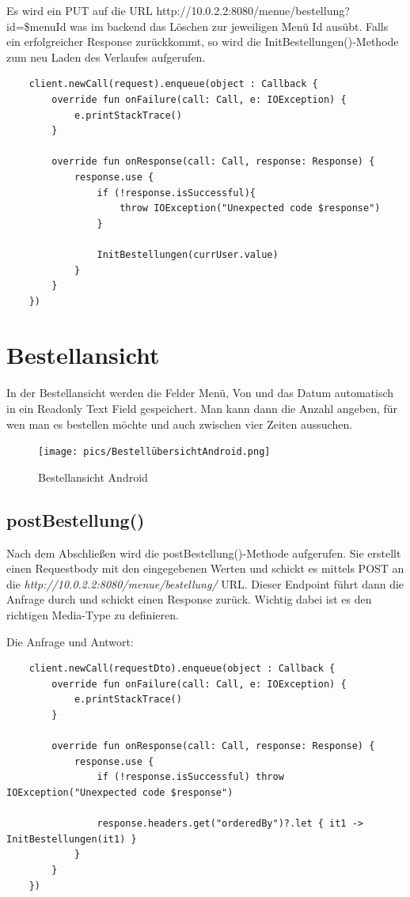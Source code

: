 Es wird ein PUT auf die URL http://10.0.2.2:8080/menue/bestellung?id=\$menuId was im backend das Löschen zur jeweiligen Menü Id ausübt.
Falls ein erfolgreicher Response zurückkommt, so wird die InitBestellungen()-Methode zum neu Laden des Verlaufes aufgerufen.

\begin{lstlisting}
    client.newCall(request).enqueue(object : Callback {
        override fun onFailure(call: Call, e: IOException) {
            e.printStackTrace()
        }

        override fun onResponse(call: Call, response: Response) {
            response.use {
                if (!response.isSuccessful){
                    throw IOException("Unexpected code $response")
                }

                InitBestellungen(currUser.value)
            }
        }
    })
\end{lstlisting}


\pagebreak


\section{Bestellansicht}

In der Bestellansicht werden die Felder Menü, Von und das Datum automatisch in ein Readonly Text Field gespeichert.
Man kann dann die Anzahl angeben, für wen man es bestellen möchte und auch zwischen vier Zeiten aussuchen. 

\begin{figure}[htp]
    \centering
    \author{Bozidar Spasenovic}
    \texttt{[image: pics/BestellübersichtAndroid.png]}
    \caption{Bestellansicht Android}
    \label{fig:impl:BestellübersichtAndroid}
\end{figure}

\subsection{postBestellung()}
Nach dem Abschließen wird die postBestellung()-Methode aufgerufen. Sie erstellt einen Requestbody mit den eingegebenen Werten
und schickt es mittels POST an die \textit{http://10.0.2.2:8080/menue/bestellung/} URL. Dieser Endpoint führt dann die Anfrage durch und schickt einen Response zurück.
Wichtig dabei ist es den richtigen Media-Type zu definieren. 

Die Anfrage und Antwort:
\begin{lstlisting}
    client.newCall(requestDto).enqueue(object : Callback {
        override fun onFailure(call: Call, e: IOException) {
            e.printStackTrace()
        }

        override fun onResponse(call: Call, response: Response) {
            response.use {
                if (!response.isSuccessful) throw IOException("Unexpected code $response")

                response.headers.get("orderedBy")?.let { it1 -> InitBestellungen(it1) }
            }
        }
    })
\end{lstlisting}


